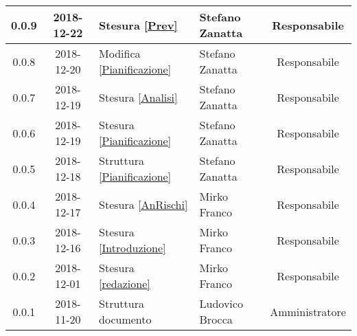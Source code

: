 \begin{center}
\begin{tabularx}{\textwidth}{|c|c|X|X|c|}
			\hline
			0.0.9 & 2018-12-22 & Stesura \cref{Prev} & Stefano Zanatta & Responsabile\\
			\hline
			0.0.8 & 2018-12-20 & Modifica \cref{Pianificazione} & Stefano Zanatta & Responsabile\\
			\hline
			0.0.7 & 2018-12-19 & Stesura \cref{Analisi}& Stefano Zanatta & Responsabile\\
			\hline
			0.0.6 & 2018-12-19 & Stesura \cref{Pianificazione} & Stefano Zanatta & Responsabile\\
			\hline
			0.0.5 & 2018-12-18 & Struttura \cref{Pianificazione} & Stefano Zanatta & Responsabile\\
			\hline
			0.0.4 & 2018-12-17 & Stesura \cref{AnRischi} & Mirko Franco & Responsabile\\
			\hline
			0.0.3 & 2018-12-16 & Stesura \cref{Introduzione} & Mirko Franco& Responsabile\\
			\hline
			0.0.2 & 2018-12-01 & Stesura \cref{redazione} & Mirko Franco& Responsabile\\
			\hline
			0.0.1 & 2018-11-20 & Struttura documento & Ludovico Brocca & Amministratore\\			
			\hline
			
		\end{tabularx}
	\end{center}
\newpage